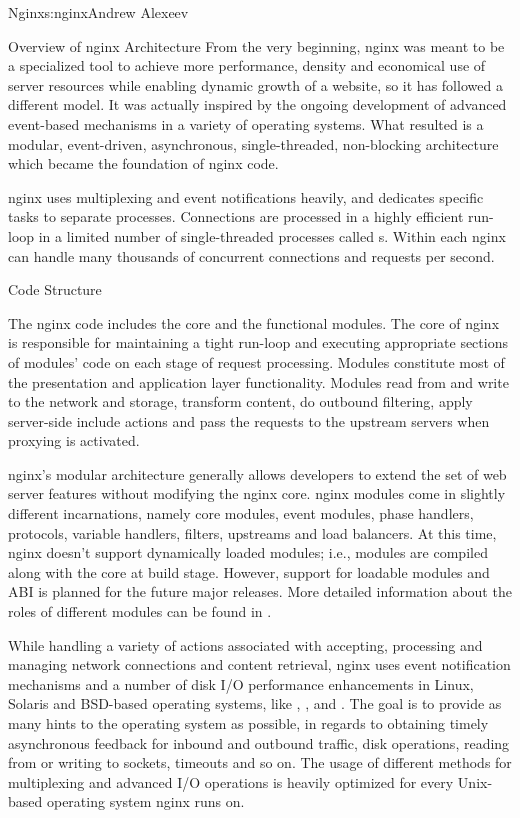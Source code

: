 \begin{aosachapter}{Nginx}{s:nginx}{Andrew Alexeev}
\begin{aosasect1}{Overview of nginx Architecture}
From the very beginning, nginx was meant to be a specialized tool to
achieve more performance, density and economical use of server
resources while enabling dynamic growth of a website, so it has
followed a different model. It was actually inspired by the ongoing
development of advanced event-based mechanisms in a variety of
operating systems. What resulted is a modular, event-driven,
asynchronous, single-threaded, non-blocking architecture which became
the foundation of nginx code.

nginx uses multiplexing and event notifications heavily, and dedicates
specific tasks to separate processes. Connections are processed in a
highly efficient run-loop in a limited number of single-threaded
processes called s. Within each  nginx can
handle many thousands of concurrent connections and requests per
second.

\begin{aosasect2}{Code Structure}

The nginx  code includes the core and the functional
modules. The core of nginx is responsible for maintaining a tight
run-loop and executing appropriate sections of modules' code on each
stage of request processing. Modules constitute most of the
presentation and application layer functionality. Modules read from
and write to the network and storage, transform content, do outbound
filtering, apply server-side include actions and pass the requests to
the upstream servers when proxying is activated.

nginx's modular architecture generally allows developers to extend the
set of web server features without modifying the nginx core. nginx
modules come in slightly different incarnations, namely core modules,
event modules, phase handlers, protocols, variable handlers, filters,
upstreams and load balancers. At this time, nginx doesn't support
dynamically loaded modules; i.e., modules are compiled along with the
core at build stage. However, support for loadable modules and ABI is
planned for the future major releases. More detailed information about
the roles of different modules can be found in 
.

While handling a variety of actions associated with accepting,
processing and managing network connections and content retrieval,
nginx uses event notification mechanisms and a number of disk I/O
performance enhancements in Linux, Solaris and BSD-based operating
systems, like , , and . The
goal is to provide as many hints to the operating system as possible,
in regards to obtaining timely asynchronous feedback for inbound and
outbound traffic, disk operations, reading from or writing to sockets,
timeouts and so on. The usage of different methods for multiplexing
and advanced I/O operations is heavily optimized for every Unix-based
operating system nginx runs on.


\end{aosasect2}
\end{aosasect1}
\end{aosachapter}
